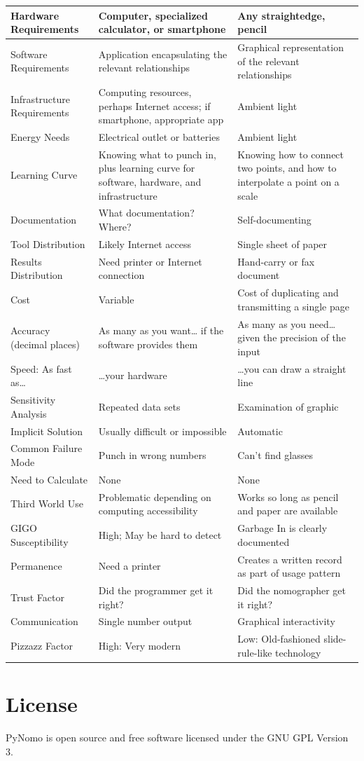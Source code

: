 \documentclass[a4paper,11pt,english]{sphinxmanual}
\begin{document}
\begin{longtable}{|p{3cm}|p{6cm}|p{6cm}|}
Hardware Requirements
 & 
Computer, specialized calculator, or smartphone
 & 
Any straightedge, pencil
\\
\hline
Software Requirements
 & 
Application encapsulating the relevant relationships
 & 
Graphical representation of the relevant relationships
\\
\hline
Infrastructure Requirements
 & 
Computing resources, perhaps Internet access; if smartphone, appropriate app
 & 
Ambient light
\\
\hline
Energy Needs
 & 
Electrical outlet or batteries
 & 
Ambient light
\\
\hline
Learning Curve
 & 
Knowing what to punch in, plus learning curve for software, hardware, and infrastructure
 & 
Knowing how to connect two points, and how to interpolate a point on a scale
\\
\hline
Documentation
 & 
What documentation? Where?
 & 
Self-documenting
\\
\hline
Tool Distribution
 & 
Likely Internet access
 & 
Single sheet of paper
\\
\hline
Results Distribution
 & 
Need printer or Internet connection
 & 
Hand-carry or fax document
\\
\hline
Cost
 & 
Variable
 & 
Cost of duplicating and transmitting a single page
\\
\hline
Accuracy (decimal places)
 & 
As many as you want… if the software provides them
 & 
As many as you need… given the precision of the input
\\
\hline
Speed: As fast as…
 & 
…your hardware
 & 
…you can draw a straight line
\\
\hline
Sensitivity Analysis
 & 
Repeated data sets
 & 
Examination of graphic
\\
\hline
Implicit Solution
 & 
Usually difficult or impossible
 & 
Automatic
\\
\hline
Common Failure Mode
 & 
Punch in wrong numbers
 & 
Can’t find glasses
\\
\hline
Need to Calculate
 & 
None
 & 
None
\\
\hline
Third World Use
 & 
Problematic depending on computing accessibility
 & 
Works so long as pencil and paper are available
\\
\hline
GIGO Susceptibility
 & 
High; May be hard to detect
 & 
Garbage In is clearly documented
\\
\hline
Permanence
 & 
Need a printer
 & 
Creates a written record as part of usage pattern
\\
\hline
Trust Factor
 & 
Did the programmer get it right?
 & 
Did the nomographer get it right?
\\
\hline
Communication
 & 
Single number output
 & 
Graphical interactivity
\\
\hline
Pizzazz Factor
 & 
High: Very modern
 & 
Low: Old-fashioned slide-rule-like technology
\\
\hline\end{longtable}



\chapter{License}
\label{index:license}
PyNomo is open source and free software licensed under the GNU GPL Version 3.



\renewcommand{\indexname}{Index}
\printindex
\end{document}
